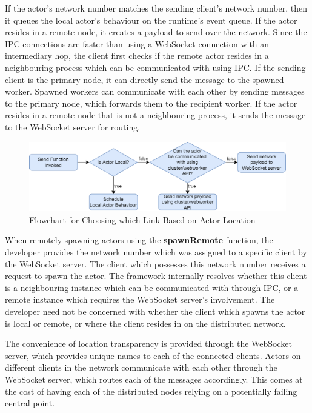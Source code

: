 \documentclass[oneside]{um-fict}
\begin{document}
If the actor's network number matches the sending client's network number, then it queues the local actor's behaviour on the runtime's event queue. If the actor resides in a remote node, it creates a payload to send over the network. Since the IPC connections are faster than using a WebSocket connection with an intermediary hop, the client first checks if the remote actor resides in a neighbouring process which can be communicated with using IPC. If the sending client is the primary node, it can directly send the message to the spawned worker. Spawned workers can communicate with each other by sending messages to the primary node, which forwards them to the recipient worker. If the actor resides in a remote node that is not a neighbouring process, it sends the message to the WebSocket server for routing.
\begin{figure}[H]
    \begin{centering}
        \includegraphics[width=\textwidth]{resources/communication.png}
        \caption{Flowchart for Choosing which Link Based on Actor Location}\label{fig:communication}
    \end{centering}
\end{figure}

When remotely spawning actors using the \textbf{spawnRemote} function, the developer provides the network number which was assigned to a specific client by the WebSocket server. The client which possesses this network number receives a request to spawn the actor. The framework internally resolves whether this client is a neighbouring instance which can be communicated with through IPC, or a remote instance which requires the WebSocket server's involvement. The developer need not be concerned with whether the client which spawns the actor is local or remote, or where the client resides in on the distributed network.

The convenience of location transparency is provided through the WebSocket server, which provides unique names to each of the connected clients. Actors on different clients in the network communicate with each other through the WebSocket server, which routes each of the messages accordingly. This comes at the cost of having each of the distributed nodes relying on a potentially failing central point.
\end{document}
